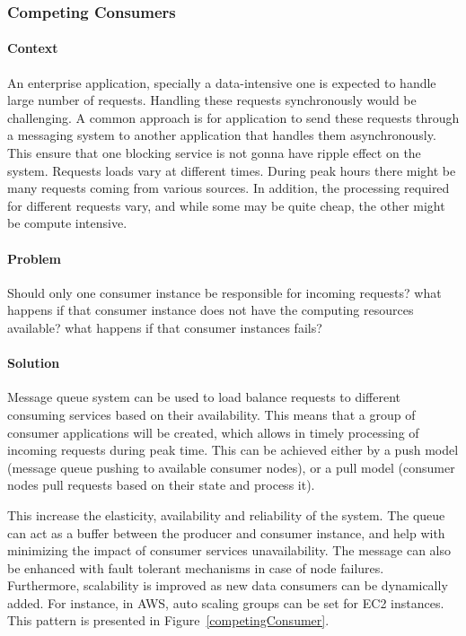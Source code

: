 \documentclass{bmcart}
\begin{document}
\subsubsection{Competing Consumers}

\paragraph{Context}

An enterprise application, specially a data-intensive one is expected to handle large number of requests. Handling these requests synchronously would be challenging. A common approach is for application to send these requests through a messaging system to another application that handles them asynchronously. This ensure that one blocking service is not gonna have ripple effect on the system. Requests loads vary at different times. During peak hours there might be many requests coming from various sources. In addition, the processing required for different requests vary, and while some may be quite cheap, the other might be compute intensive. 


\paragraph{Problem}

Should only one consumer instance be responsible for incoming requests? what happens if that consumer instance does not have the computing resources available? what happens if that consumer instances fails? 


\paragraph{Solution}

Message queue system can be used to load balance requests to different consuming services based on their availability. This means that a group of consumer applications will be created, which allows in timely processing of incoming requests during peak time. This can be achieved either by a push model (message queue pushing to available consumer nodes), or a pull model (consumer nodes pull requests based on their state and process it).

This increase the elasticity, availability and reliability of the system. The queue can act as a buffer between the producer and consumer instance, and help with minimizing the impact of consumer services unavailability. The message can also be enhanced with fault tolerant mechanisms in case of node failures. Furthermore, scalability is improved as new data consumers can be dynamically added. For instance, in AWS, auto scaling groups can be set for EC2 instances. This pattern is presented in Figure~\ref{competingConsumer}.
\end{document}
